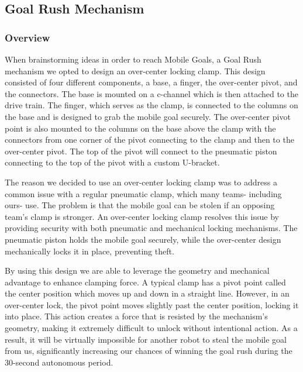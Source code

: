 \subsection{Goal Rush Mechanism}

\subsubsection{Overview}

When brainstorming ideas in order to reach Mobile Goals, a Goal Rush mechanism we opted to design an over-center
locking clamp. This design consisted of four different components, a base, a finger, the
over-center pivot, and the connectors. The base is mounted on a c-channel which is then attached to the
drive train. The finger, which serves as the clamp, is connected to the columns on the base and
is designed to grab the mobile goal securely. The over-center pivot point is also mounted to the
columns on the base above the clamp with the connectors from one corner of the pivot
connecting to the clamp and then to the over-center pivot. The top of the pivot will connect to the
pneumatic piston connecting to the top of the pivot with a custom U-bracket.
\newline

The reason we decided to use an over-center locking clamp was to address a common issue
with a regular pneumatic clamp, which many teams- including ours- use. The problem is that the
mobile goal can be stolen if an opposing team’s clamp is stronger. An over-center locking clamp
resolves this issue by providing security with both pneumatic and mechanical locking
mechanisms. The pneumatic piston holds the mobile goal securely, while the over-center design
mechanically locks it in place, preventing theft.
\newline

By using this design we are able to leverage the geometry and mechanical advantage to enhance
clamping force. A typical clamp has a pivot point called the center position which moves up and down
in a straight line. However, in an over-center lock, the pivot point moves slightly past the center
position, locking it into place. This action creates a force that is resisted by the mechanism’s
geometry, making it extremely difficult to unlock without intentional action. As a result, it will be
virtually impossible for another robot to steal the mobile goal from us, significantly increasing our
chances of winning the goal rush during the 30-second autonomous period.
\newline

